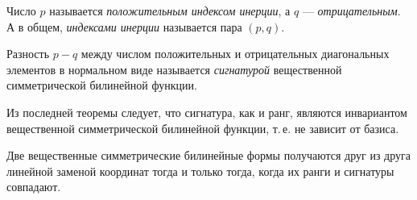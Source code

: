 \begin{definition}
    Число $p$ называется \textit{положительным индексом инерции}, а $q$ --- \textit{отрицательным}. А в общем, \textit{индексами инерции} называется пара $(p, q)$.
\end{definition}

\begin{definition}
    Разность $p - q$ между числом положительных и отрицательных диагональных элементов в нормальном виде называется \textit{сигнатурой} вещественной симметрической билинейной функции.
\end{definition}

Из последней теоремы следует, что сигнатура, как и ранг, являются инвариантом вещественной симметрической билинейной функции, т.\,е. не зависит от базиса.

\begin{corollary}
    Две вещественные симметрические билинейные формы получаются друг из друга линейной заменой координат тогда и только тогда, когда их ранги и сигнатуры совпадают.
\end{corollary}

